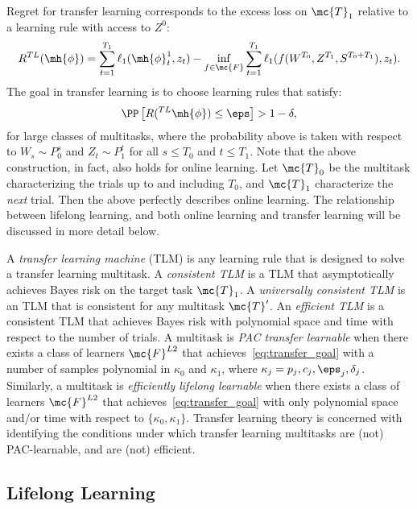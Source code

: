\documentclass{article}
\begin{document}
Regret for transfer learning corresponds to the excess loss on $\mc{T}_1$ relative to a learning rule with access to $Z^0$:
\begin{align}
    R^{TL}(\mh{\phi}) = \sum_{t=1}^{T_1} \ell_1(\mh{\phi}^1_t, z_t)    - \inf_{f \in \mc{F}} \sum_{t=1}^{T_1} \ell_1(f(W^{T_0}, Z^{T_1}, S^{T_0+T_1}), z_t).
\end{align}
The goal in transfer learning  is to choose learning rules that satisfy:
\begin{align} \label{eq:transfer_goal}
    \PP\left[R(^{TL}\mh{\phi})  \leq \eps \right] > 1 - \delta,
\end{align}
for large classes of multitasks, 
where the probability above is taken with respect to $W_s \sim P_0^s$ and $Z_t \sim P_1^t$ for all $s \leq T_0$ and $t \leq T_1$.  Note that the above construction, in fact, also holds for online learning.  Let $\mc{T}_0$ be the multitask characterizing the trials up to and including $T_0$, and $\mc{T}_1$ characterize the \emph{next} trial.  Then the above perfectly describes online learning.  The relationship between lifelong learning, and both online learning and transfer learning will be discussed in more detail below. 

A \emph{transfer learning machine} (TLM) is any learning rule that is designed to solve a transfer learning multitask. A \emph{consistent TLM} is a TLM that asymptotically achieves Bayes risk on the target task $\mc{T}_1$.  
A \emph{universally consistent TLM} is an TLM that is consistent for any multitask $\mc{T}'$.  
An \emph{efficient TLM}  is a consistent TLM that achieves Bayes risk with polynomial space and time with respect to the number of trials. 
A multitask is \emph{PAC transfer learnable} when there exists a class of learners $\mc{F}^{L2}$ that achieves~\eqref{eq:transfer_goal} with a number of samples polynomial in $\kappa_0$ and $\kappa_1$, where $\kappa_j=p_j,c_j,\eps_j,\delta_j$.  Similarly, a multitask is \emph{efficiently lifelong learnable} when there exists a class of learners $\mc{F}^{L2}$ that achieves~\eqref{eq:transfer_goal} with only polynomial space and/or time with respect to $\{\kappa_0, \kappa_1\}$.
{Transfer learning theory is concerned with identifying the conditions under which transfer learning multitasks are (not) PAC-learnable, and are (not) efficient.}



\subsection{Lifelong Learning}
\end{document}
